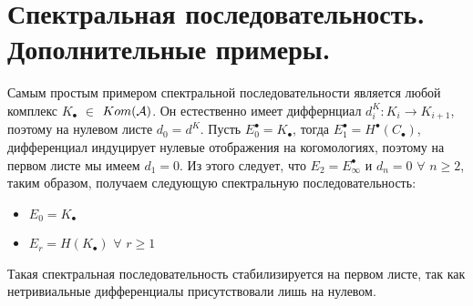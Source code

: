 \documentclass[../main.tex]{subfiles}
\begin{document}
\section{Спектральная последовательность. Дополнительные примеры. }
\begin{to_ex}
Самым простым примером спектральной последовательности является любой комплекс $K_\bullet$ $\in$ $Kom(\mathcal{A})$. Он естественно имеет диффернциал $d_i^{K}\colon K_i \to K_{i+1}$, поэтому на нулевом листе $d_0 = d^K$. Пусть $E^\bullet_0 = K_\bullet$, тогда $E^\bullet_1 = H^\bullet(C_\bullet)$, дифференциал индуцирует нулевые отображения на когомологиях, поэтому на первом листе мы имеем $d_1 = 0$. Из этого следует, что $E_2 = E^\bullet_{\infty}$ и $d_n = 0$ $\forall$ $n\ge 2$, таким образом, получаем следующую спектральную последовательность:
\begin{itemize}
    \item $E_0 = K_\bullet$
    \item  $E_r = H(K_\bullet)$ $\forall$ $r\ge1$
\end{itemize}
Такая спектральная последовательность стабилизируется на первом листе, так как нетривиальные дифференциалы присутствовали лишь на нулевом. 
\end{to_ex}
\end{document}
